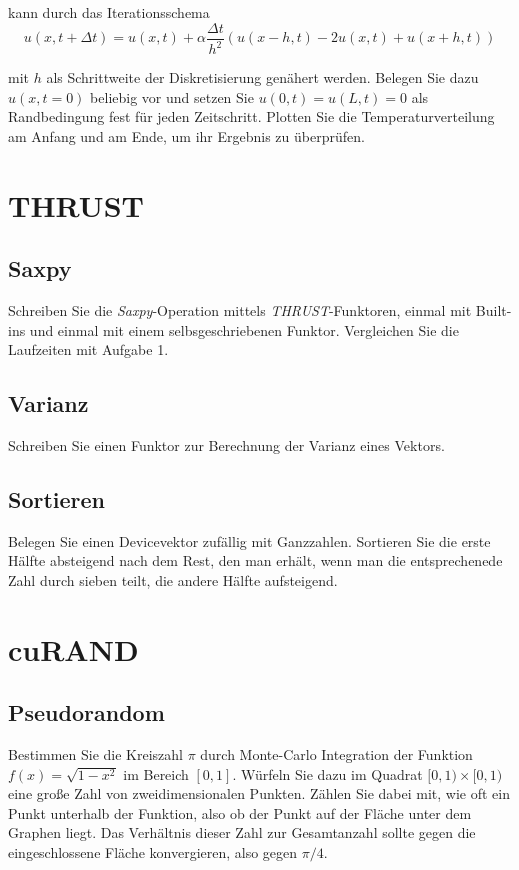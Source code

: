 \documentclass[headsepline=3pt,headinclude=true,12pt,oneside]{scrartcl}
\begin{document}
	kann durch das Iterationsschema
	\begin{equation}\label{tps}
		u(x,t + \Delta t) = u(x,t) + \alpha \frac{\Delta t}{h^2}(u(x-h,t)-2u(x,t)+u(x+h,t))
	\end{equation}
	
	mit $h$ als Schrittweite der Diskretisierung genähert werden. Belegen Sie dazu $u(x,t=0)$ beliebig vor und setzen Sie $u(0,t)=u(L,t)=0$ als Randbedingung fest für jeden Zeitschritt. Plotten Sie die Temperaturverteilung am Anfang und am Ende, um ihr Ergebnis zu überprüfen.	
		
	\section{THRUST}
		\subsection*{Saxpy}
		Schreiben Sie die \textit{Saxpy}-Operation mittels \textit{THRUST}-Funktoren, einmal mit Built-ins und einmal mit einem selbsgeschriebenen Funktor. Vergleichen Sie die Laufzeiten mit Aufgabe 1.
		\subsection*{Varianz}
		Schreiben Sie einen Funktor zur Berechnung der Varianz eines Vektors.		
		
		\subsection{Sortieren}
		Belegen Sie einen Devicevektor zufällig mit Ganzzahlen. Sortieren Sie die erste Hälfte absteigend nach dem Rest, den man erhält, wenn man die entsprechenede Zahl durch sieben teilt, die andere Hälfte aufsteigend. 
			
			
		\section{cuRAND}
			\subsection{Pseudorandom}
			Bestimmen Sie die Kreiszahl $\pi$ durch Monte-Carlo Integration der Funktion $f(x) = \sqrt{1-x^2}$ im Bereich $[0,1]$. Würfeln Sie dazu im Quadrat $[0,1)\times[0,1)$ eine große Zahl von zweidimensionalen Punkten. Zählen Sie dabei mit, wie oft ein Punkt unterhalb der Funktion, also ob der Punkt auf der Fläche unter dem Graphen liegt. Das Verhältnis dieser Zahl zur Gesamtanzahl sollte gegen die eingeschlossene Fläche konvergieren, also gegen $\pi/4$.
\end{document}

